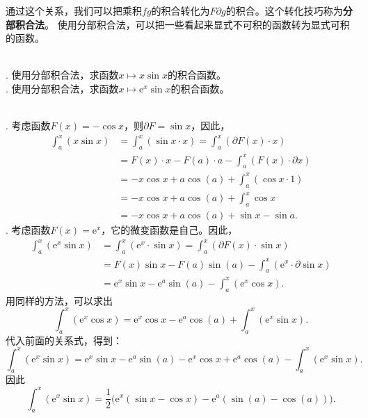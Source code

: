 \documentclass[12pt,UTF8,fontset=none]{ctexbook}
\begin{document}
通过这个关系，我们可以把乘积$fg$的积合转化为$F\partial g$的积合。这个转化技巧称为\textbf{分部积合法}。
使用分部积合法，可以把一些看起来显式不可积的函数转为显式可积的函数。

\begin{et}
    \mbox{} \\
    . 使用分部积合法，求函数$x\mapsto x \sin{x}$的积合函数。\\
    . 使用分部积合法，求函数$x\mapsto \mathrm{e}^x \sin{x}$的积合函数。\\
\end{et}

\begin{so}    
    \mbox{} \\
    . 考虑函数$F(x) = -\cos{x}$，则$\partial F = \sin{x}$，因此，
    \begin{align*}
        \int_a^x (x\sin{x}) &= \int_a^x (\sin{x}\cdot x) = \int_a^x (\partial F(x) \cdot x) \\
        &= F(x)\cdot x - F(a)\cdot a - \int_a^x (F(x) \cdot \partial x) \\
        &= -x\cos{x} + a\cos(a) + \int_a^x (\cos{x} \cdot 1) \\
        &= -x\cos{x} + a\cos(a) + \int_a^x \cos{x} \\
        &= -x\cos{x} + a\cos(a) + \sin{x} - \sin{a}.
    \end{align*}
    . 考虑函数$F(x) = \mathrm{e}^x$，它的微变函数是自己。因此，
    \begin{align*}
        \int_a^x \left(\mathrm{e}^{x} \sin{x}\right) &= \int_a^x \left(\mathrm{e}^x\cdot \sin{x}\right) = \int_a^x \left(\partial F(x) \cdot \sin{x}\right) \\
        &= F(x)\sin{x} - F(a)\sin(a) - \int_a^x \left(\mathrm{e}^{x} \cdot \partial \sin{x}\right) \\
        &= \mathrm{e}^x\sin{x} - \mathrm{e}^a\sin(a) - \int_a^x \left(\mathrm{e}^x \cos{x}\right) .
    \end{align*}
    用同样的方法，可以求出
    $$  \int_a^x \left(\mathrm{e}^x \cos{x}\right) = \mathrm{e}^x\cos{x} - \mathrm{e}^a\cos(a) + \int_a^x \left(\mathrm{e}^{x} \sin{x}\right). $$
    代入前面的关系式，得到：
    $$ \int_a^x \left(\mathrm{e}^{x} \sin{x}\right) = \mathrm{e}^x\sin{x} - \mathrm{e}^a\sin(a) - \mathrm{e}^x\cos{x} + \mathrm{e}^a\cos(a) - \int_a^x \left(\mathrm{e}^{x} \sin{x}\right). $$
    因此
    $$ \int_a^x \left(\mathrm{e}^{x} \sin{x}\right) = \frac{1}{2}\big(\mathrm{e}^x(\sin{x} - \cos{x}) - \mathrm{e}^a(\sin(a) - \cos(a))\big).$$
\end{so}
\end{document}
